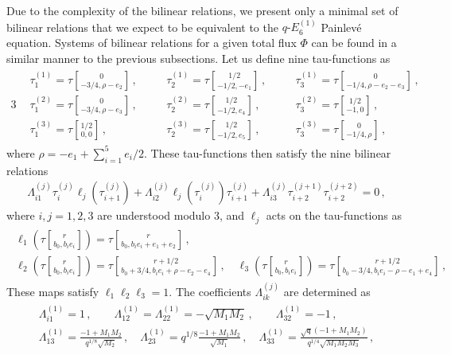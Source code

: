 \documentclass[11pt, a4paper]{article}
\newcommand{\tauftn}[2]{\tau\genfrac[]{0pt}{1}{#1}{#2}}
\theoremstyle{definition}
\begin{document}
Due to the complexity of the bilinear relations, we present only a minimal set of bilinear relations that we expect to be equivalent to the $ q\text{-}E_6^{(1)} $ Painlev\'e equation. Systems of bilinear relations for a given total flux $ \Phi $ can be found in a similar manner to the previous subsections. Let us define nine tau-functions as
\begin{alignat}{3}
    \begin{aligned}\label{eq:5F-tau}
        &\tau_1^{(1)} = \tauftn{0}{-3/4, \rho-e_2} \, , \quad
        &&\tau_2^{(1)} = \tauftn{1/2}{-1/2,-e_1} \, , \quad
        &&\tau_3^{(1)} = \tauftn{0}{-1/4, \rho-e_2-e_3} \, , \\
        &\tau_1^{(2)} = \tauftn{0}{-3/4, \rho-e_3} \, , \quad
        &&\tau_2^{(2)} = \tauftn{1/2}{-1/2, e_4} \, , \quad
        &&\tau_3^{(2)} = \tauftn{1/2}{-1, 0} \, , \\
        &\tau_1^{(3)} = \tauftn{1/2}{0, 0} \, , \quad
        &&\tau_2^{(3)} = \tauftn{1/2}{-1/2, e_5} \, , \quad
        &&\tau_3^{(3)} = \tauftn{0}{-1/4, \rho} \, ,
    \end{aligned}
\end{alignat}
where $ \rho = -e_1 + \sum_{i=1}^5 e_i/2 $. These tau-functions then satisfy the nine bilinear relations
\begin{align}\label{eq:5F-bilinear}
    \Lambda_{i1}^{(j)} \tau_i^{(j)} \ell_j(\tau_{i+1}^{(j)}) + \Lambda_{i2}^{(j)} \ell_j(\tau_{i}^{(j)}) \tau_{i+1}^{(j)} + \Lambda_{i3}^{(j)} \tau_{i+2}^{(j+1)} \tau_{i+2}^{(j+2)} = 0 \, ,
\end{align}
where $ i,j=1,2,3 $ are understood modulo 3, and $ \ell_j $ acts on the tau-functions as
\begin{gather}
    \begin{gathered}
        \ell_1\left(\tauftn{r}{b_0, b_i e_i}\right) = \tauftn{r}{b_0, b_ie_i +e_1+e_2} \, , \\
        \ell_2\left(\tauftn{r}{b_0, b_i e_i}\right) = \tauftn{r+1/2}{b_0+3/4, b_i e_i+\rho-e_2-e_4} \, , \quad
        \ell_3\left(\tauftn{r}{b_0, b_i e_i}\right) = \tauftn{r+1/2}{b_0-3/4, b_i e_i-\rho-e_1+e_4} \, ,
    \end{gathered}
\end{gather}
These maps satisfy $ \ell_1 \ell_2 \ell_3 = 1 $. The coefficients $ \Lambda_{ik}^{(j)} $ are determined as
\begin{gather}
    \begin{gathered}
        \Lambda_{i1}^{(1)} = 1 \, , \qquad
        \Lambda_{12}^{(1)} = \Lambda_{22}^{(1)} = -\sqrt{M_1M_2} \, , \qquad
        \Lambda_{32}^{(1)} = -1 \, , \\
        \Lambda_{13}^{(1)} = \frac{-1 + M_1M_2}{q^{1/8}\sqrt{M_2}} \, , \quad
        \Lambda_{23}^{(1)} = q^{1/8} \frac{-1+M_1M_2}{\sqrt{M_1}} \, , \quad
        \Lambda_{33}^{(1)} = \frac{\sqrt{\mathfrak{q}} (-1+M_1M_2)}{q^{1/4} \sqrt{M_1M_2M_3}} \, ,
    \end{gathered}
\end{gather}
\end{document}
